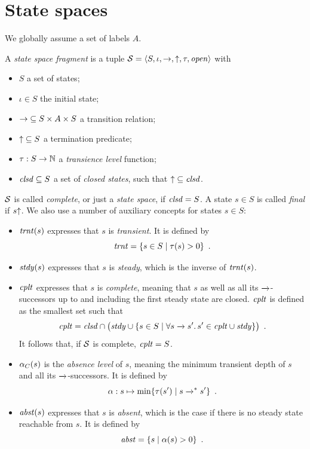 \documentclass{article}
\begin{document}
\section*{State spaces}

\medskip\noindent
We globally assume a set of labels $A$.

\medskip\noindent 
A \emph{state space fragment} is a tuple $\mathcal{S}=\langle{S,\iota,{\rightarrow},{{\uparrow}},\ensuremath{\tau},\ensuremath{\mathit{open}}}\rangle$ with
\begin{itemize}
\item $S$ a set of states;
\item $\iota\in S$ the initial state;
\item ${\rightarrow}\subseteq S\times A\times S$ a transition relation;
\item ${{\uparrow}}\subseteq S$ a termination predicate;
\item ${\tau}:S\to \mathbb{N}$ a \emph{transience level} function;
\item $\mathit{clsd}\subseteq S$ a set of \emph{closed states}, such that ${\uparrow}\subseteq \mathit{clsd}$.
\end{itemize}
%
$\mathcal{S}$ is called \emph{complete}, or just a \emph{state space}, if $\mathit{clsd}=S$. A state $s\in S$ is called \emph{final} if $s{\uparrow}$. We also use a number of auxiliary concepts for states $s\in S$:

\begin{itemize}
\item $\mathit{trnt}(s)$ expresses that $s$ is \emph{transient}. It is defined by
%
\[ \mathit{trnt} = \{{{s\in S}\mid{\ensuremath{\tau}(s)>0}}\} \enspace. \]

\item $\mathit{stdy}(s)$ expresses that $s$ is \emph{steady}, which is the inverse of $\mathit{trnt}(s)$.

\item $\mathit{cplt}$ expresses that $s$ is \emph{complete}, meaning that $s$ as well as all its $\trans{}$-successors up to and including the first steady state are closed. $\mathit{cplt}$ is defined as the smallest set such that
%
\[ \Complete = \Closed\cap \bigl(\Steady \cup \gensetof{s\in S}{\forall s\trans{} s'.\, s'\in \Complete\cup \Steady}\bigr) \enspace.
\]
It follows that, if $\mathcal{S}$ is complete, $\mathit{cplt}=S$.

\item $\alpha_C(s)$ is the \emph{absence level} of $s$, meaning the minimum transient depth of $s$ and all its $\trans{}$-successors. It is defined by
%
\[ \ALevel: s\mapsto \min\gensetof{\TLevel(s')}{s\trans{}^* s'} \enspace. \]

\item $\mathit{abst}(s)$ expresses that $s$ is \emph{absent}, which is the case if there is no steady state reachable from $s$. It is defined by
%
\[ \mathit{abst}= \{{{s}\mid{\ensuremath{\alpha}(s)>0}}\} \enspace. \]
\end{itemize}
\end{document}
